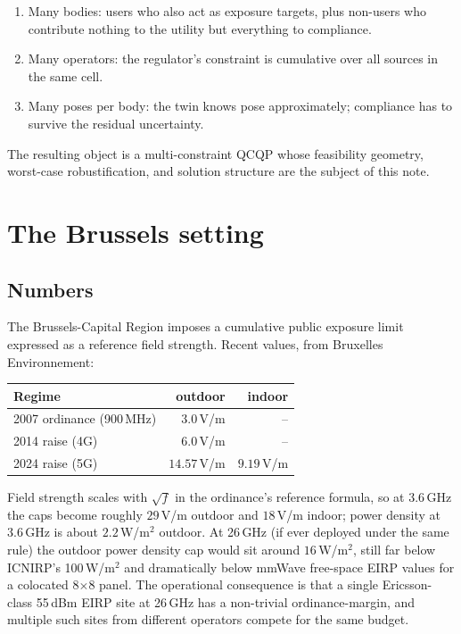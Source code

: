 \documentclass[11pt,a4paper]{article}
\theoremstyle{definition}
\begin{document}
\begin{enumerate}[leftmargin=1.6em,itemsep=2pt]
\item Many bodies: users who also act as exposure targets, plus
      non-users who contribute nothing to the utility but everything
      to compliance.
\item Many operators: the regulator's constraint is cumulative over
      all sources in the same cell.
\item Many poses per body: the twin knows pose approximately;
      compliance has to survive the residual uncertainty.
\end{enumerate}

The resulting object is a multi-constraint QCQP whose feasibility
geometry, worst-case robustification, and solution structure are the
subject of this note.

\section{The Brussels setting}

\subsection{Numbers}

The Brussels-Capital Region imposes a cumulative public exposure
limit expressed as a reference field strength. Recent values, from
Bruxelles Environnement:

\begin{center}\small
\begin{tabular}{lrr}
\toprule
Regime                   & outdoor          & indoor          \\
\midrule
2007 ordinance (900\,MHz)& $3.0$\,V/m       & --              \\
2014 raise (4G)          & $6.0$\,V/m       & --              \\
2024 raise (5G)          & $14.57$\,V/m     & $9.19$\,V/m     \\
\bottomrule
\end{tabular}
\end{center}

Field strength scales with $\sqrt{f}$ in the ordinance's reference
formula, so at 3.6\,GHz the caps become roughly $29$\,V/m outdoor and
$18$\,V/m indoor; power density at 3.6\,GHz is about
$2.2$\,W/m$^{2}$ outdoor. At 26\,GHz (if ever deployed under the
same rule) the outdoor power density cap would sit around
$16$\,W/m$^{2}$, still far below ICNIRP's 100\,W/m$^{2}$ and
dramatically below mmWave free-space EIRP values for a colocated
8$\times$8 panel. The operational consequence is that a single
Ericsson-class 55\,dBm EIRP site at 26\,GHz has a non-trivial
ordinance-margin, and multiple such sites from different operators
compete for the same budget.
\end{document}
